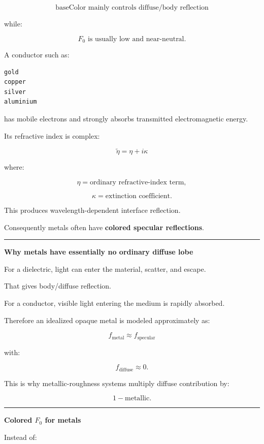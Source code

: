 \[
\boxed{
\text{baseColor mainly controls diffuse/body reflection}
}
\]

while:

\[
\boxed{
F_0\text{ is usually low and near-neutral}.
}
\]

A conductor such as:

\begin{verbatim}
gold
copper
silver
aluminium
\end{verbatim}

has mobile electrons and strongly absorbs transmitted electromagnetic energy.

Its refractive index is complex:

\[
\boxed{
\tilde{\eta}
=
\eta+i\kappa
}
\]

where:

\[
\eta=\text{ordinary refractive-index term},
\]

\[
\kappa=\text{extinction coefficient}.
\]

This produces wavelength-dependent interface reflection.

Consequently metals often have \textbf{colored specular reflections}.

\begin{center}\rule{0.5\linewidth}{0.5pt}\end{center}

\textbf{Why metals have essentially no ordinary diffuse lobe}

For a dielectric, light can enter the material, scatter, and escape.

That gives body/diffuse reflection.

For a conductor, visible light entering the medium is rapidly absorbed.

Therefore an idealized opaque metal is modeled approximately as:

\[
\boxed{
f_{\text{metal}}
\approx
f_{\text{specular}}
}
\]

with:

\[
f_{\text{diffuse}}\approx0.
\]

This is why metallic-roughness systems multiply diffuse contribution by:

\[
1-\text{metallic}.
\]

\begin{center}\rule{0.5\linewidth}{0.5pt}\end{center}

\textbf{Colored \(F_0\) for metals}

Instead of:

